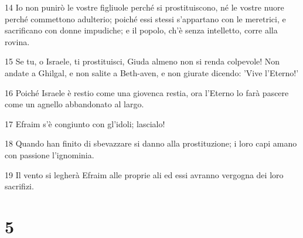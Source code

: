 \par 14 Io non punirò le vostre figliuole perché si prostituiscono, né le vostre nuore perché commettono adulterio; poiché essi stessi s'appartano con le meretrici, e sacrificano con donne impudiche; e il popolo, ch'è senza intelletto, corre alla rovina.
\par 15 Se tu, o Israele, ti prostituisci, Giuda almeno non si renda colpevole! Non andate a Ghilgal, e non salite a Beth-aven, e non giurate dicendo: 'Vive l'Eterno!'
\par 16 Poiché Israele è restio come una giovenca restia, ora l'Eterno lo farà pascere come un agnello abbandonato al largo.
\par 17 Efraim s'è congiunto con gl'idoli; lascialo!
\par 18 Quando han finito di sbevazzare si danno alla prostituzione; i loro capi amano con passione l'ignominia.
\par 19 Il vento si legherà Efraim alle proprie ali ed essi avranno vergogna dei loro sacrifizi.

\chapter{5}

